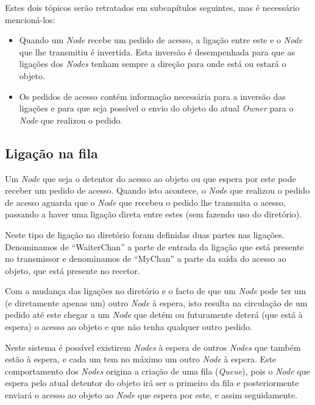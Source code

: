 Estes dois tópicos serão retratados em subcapítulos seguintes, mas é necessário mencioná-los:
\begin{itemize}
    \item Quando um \emph{Node} recebe um pedido de acesso, a ligação entre este e o \emph{Node} que lhe transmitiu é invertida. Esta inversão é desempenhada para que as ligações dos \emph{Nodes} tenham sempre a direção para onde está ou estará o objeto.

    \item Os pedidos de acesso contém informação necessária para a inversão das ligações e para que seja possível o envio do objeto do atual \emph{Owner} para o \emph{Node} que realizou o pedido.
\end{itemize}


\subsection*{Ligação na fila}
Um \emph{Node} que seja o detentor do acesso ao objeto ou que espera por este pode receber um pedido de acesso. Quando isto acontece, o \emph{Node} que realizou o pedido de acesso aguarda que o \emph{Node} que recebeu o pedido lhe transmita o acesso, passando a haver uma ligação direta entre estes (sem fazendo uso do diretório).

Neste tipo de ligação no diretório foram definidas duas partes nas ligações. Denominamos de  ``WaiterChan'' a parte de entrada da ligação que está presente no transmissor e denominamos de ``MyChan'' a parte da saída do acesso ao objeto, que está presente no recetor.

Com a mudança das ligações no diretório e o facto de que um \emph{Node} pode ter um (e diretamente apenas um) outro \emph{Node} à espera, isto resulta na circulação de um pedido até este chegar a um \emph{Node} que detém ou futuramente deterá (que está à espera) o acesso ao objeto e que não tenha qualquer outro pedido.

Neste sistema é possível existirem \emph{Nodes} à espera de outros \emph{Nodes} que também estão à espera, e cada um tem no máximo um outro \emph{Node} à espera. 
Este comportamento dos \emph{Nodes} origina a criação de uma fila (\emph{Queue}), pois o \emph{Node} que espera pelo atual detentor do objeto irá ser o primeiro da fila e posteriormente enviará o acesso ao objeto ao \emph{Node} que espera por este, e assim seguidamente.


